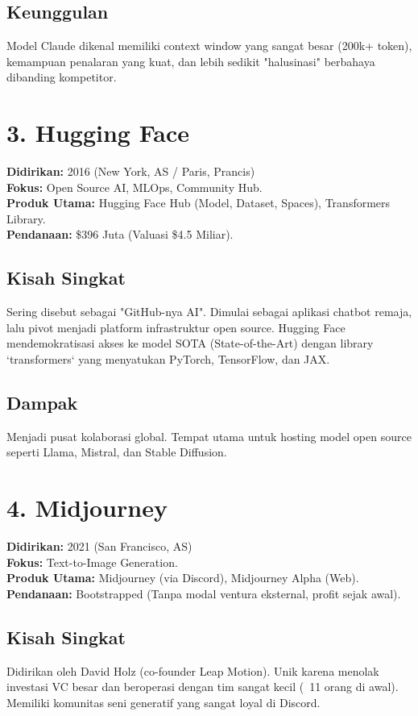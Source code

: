 \subsection*{Keunggulan}
Model Claude dikenal memiliki context window yang sangat besar (200k+ token), kemampuan penalaran yang kuat, dan lebih sedikit "halusinasi" berbahaya dibanding kompetitor.

\section{3. Hugging Face}
\textbf{Didirikan:} 2016 (New York, AS / Paris, Prancis) \\
\textbf{Fokus:} Open Source AI, MLOps, Community Hub. \\
\textbf{Produk Utama:} Hugging Face Hub (Model, Dataset, Spaces), Transformers Library. \\
\textbf{Pendanaan:} \$396 Juta (Valuasi \$4.5 Miliar).

\subsection*{Kisah Singkat}
Sering disebut sebagai "GitHub-nya AI". Dimulai sebagai aplikasi chatbot remaja, lalu pivot menjadi platform infrastruktur open source. Hugging Face mendemokratisasi akses ke model SOTA (State-of-the-Art) dengan library `transformers` yang menyatukan PyTorch, TensorFlow, dan JAX.

\subsection*{Dampak}
Menjadi pusat kolaborasi global. Tempat utama untuk hosting model open source seperti Llama, Mistral, dan Stable Diffusion.

\section{4. Midjourney}
\textbf{Didirikan:} 2021 (San Francisco, AS) \\
\textbf{Fokus:} Text-to-Image Generation. \\
\textbf{Produk Utama:} Midjourney (via Discord), Midjourney Alpha (Web). \\
\textbf{Pendanaan:} Bootstrapped (Tanpa modal ventura eksternal, profit sejak awal).

\subsection*{Kisah Singkat}
Didirikan oleh David Holz (co-founder Leap Motion). Unik karena menolak investasi VC besar dan beroperasi dengan tim sangat kecil (~11 orang di awal). Memiliki komunitas seni generatif yang sangat loyal di Discord.

